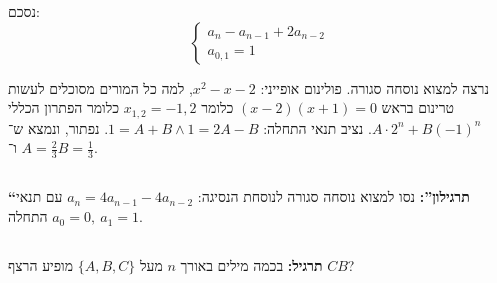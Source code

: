 \documentclass[]{article}
\begin{document}
	נסכם: 
	\[ \begin{cases}
		a_n - a_{n - 1} + 2a_{n - 2} \\
		a_{0, 1} = 1
	\end{cases} \]
	
	נרצה למצוא נוסחה סגורה. פולינום אופייני: $x^2 - x - 2 $, למה כל המורים מסוכלים לעשות טרינום בראש $(x - 2)(x + 1) = 0 $ כלומר $x_{1, 2} = -1, 2 $ כלומר הפתרון הכללי $A \cdot 2^n + B(-1)^n $. נציב תנאי התחלה: $1 = A + B \land 1 = 2A - B$. נפתור, ונמצא ש־$A = \frac{2}{3}$ ו־$B = \frac{1}{3}$. 
	
	\subsection{}
	\textbf{``תרגילון'': }נסו למצוא נוסחה סגורה לנוסחת הנסיגה: $ a_n = 4a_{n - 1} - 4a_{n - 2} $ עם תנאי התחלה $a_0 = 0, \ a_1 = 1$. 
	\subsection{}
	\textbf{תרגיל: }בכמה מילים באורך $n$ מעל $\{A, B, C\}$ מופיע הרצף $CB$?
	
\end{document}

